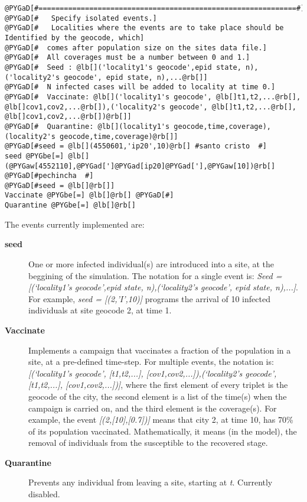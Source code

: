 \documentclass[a4paper,10pt]{manual}
\begin{document}
\begin{Verbatim}[commandchars=@\[\]]
@PYGaD[#=============================================================#]
@PYGaD[#   Specify isolated events.]
@PYGaD[#   Localities where the events are to take place should be Identified by the geocode, which]
@PYGaD[#  comes after population size on the sites data file.]
@PYGaD[#  All coverages must be a number between 0 and 1.]
@PYGaD[#  Seed : @lb[]('locality1's geocode',epid state, n),('locality2's geocode', epid state, n),...@rb[]]
@PYGaD[#  N infected cases will be added to locality at time 0.]
@PYGaD[#  Vaccinate: @lb[]('locality1's geocode', @lb[]t1,t2,...@rb[], @lb[]cov1,cov2,...@rb[]),('locality2's geocode', @lb[]t1,t2,...@rb[], @lb[]cov1,cov2,...@rb[])@rb[]]
@PYGaD[#  Quarantine: @lb[](locality1's geocode,time,coverage), (locality2's geocode,time,coverage)@rb[]]
@PYGaD[#seed = @lb[](4550601,'ip20',10)@rb[] #santo cristo  #]
seed @PYGbe[=] @lb[](@PYGaw[4552110],@PYGad[']@PYGad[ip20]@PYGad['],@PYGaw[10])@rb[] @PYGaD[#pechincha  #]
@PYGaD[#seed = @lb[]@rb[]]
Vaccinate @PYGbe[=] @lb[]@rb[] @PYGaD[#]
Quarantine @PYGbe[=] @lb[]@rb[]
\end{Verbatim}

The events currently implemented are:
\begin{description}
\item[\textbf{seed}]
One or more infected individual(s) are introduced into a site, at the beggining of the simulation. The notation for a single event is: \emph{Seed = {[}(`locality1's geocode',epid state, n),(`locality2's geocode', epid state, n),...{]}}. For example, \emph{seed = {[}(2,'I',10){]}} programs the arrival of 10 infected individuals at site geocode 2, at time 1.

\item[\textbf{Vaccinate}]
Implements a campaign that vaccinates a fraction of the population in a site, at a pre-defined time-step. For multiple events, the notation is: \emph{{[}(`locality1's geocode', {[}t1,t2,...{]}, {[}cov1,cov2,...{]}),(`locality2's geocode', {[}t1,t2,...{]}, {[}cov1,cov2,...{]}){]}}, where the first element of every triplet is the geocode of the city, the second element is a list of the time(s) when the campaign is carried on, and the third element is the coverage(s). For example, the event \emph{{[}(2,{[}10{]},{[}0.7{]}){]}} means that city 2, at time 10, has 70\% of its population vaccinated. Mathematically, it means (in the model), the removal of individuals from the susceptible to the recovered stage.

\item[\textbf{Quarantine}]
Prevents any individual from leaving a site, starting at \emph{t}. Currently disabled.

\end{description}
\end{document}
